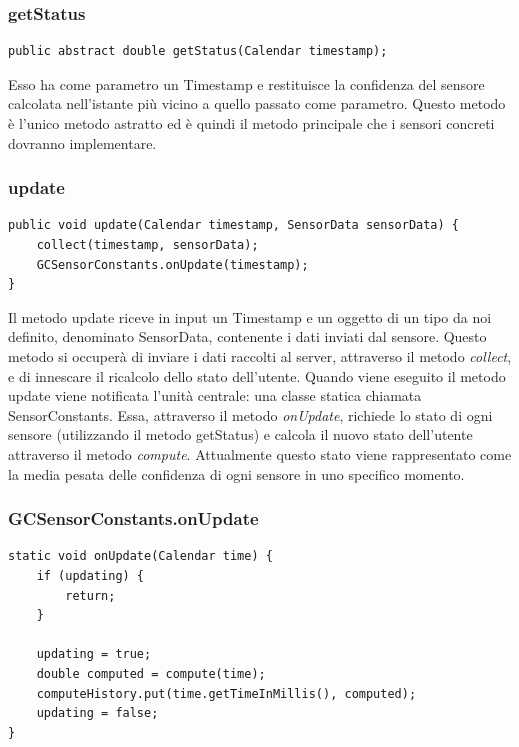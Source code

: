 \subsubsection{getStatus}
\begin{verbatim}
public abstract double getStatus(Calendar timestamp);
\end{verbatim}
Esso ha come parametro un Timestamp e restituisce la confidenza del sensore calcolata nell'istante più vicino a quello passato come parametro. Questo metodo è l'unico metodo astratto ed è quindi il metodo principale che i sensori concreti dovranno implementare.
\subsubsection{update}

\begin{verbatim}
public void update(Calendar timestamp, SensorData sensorData) {
    collect(timestamp, sensorData);
    GCSensorConstants.onUpdate(timestamp);
}
\end{verbatim}
Il metodo update riceve in input un Timestamp e un oggetto di un tipo da noi definito, denominato SensorData, contenente i dati inviati dal sensore. Questo metodo si occuperà di inviare i dati raccolti al server, attraverso il metodo \textit{collect}, e di innescare il ricalcolo dello stato dell'utente.
Quando viene eseguito il metodo update viene notificata l'unità centrale: una classe statica chiamata SensorConstants. Essa, attraverso il metodo \textit{onUpdate}, richiede lo stato di ogni sensore (utilizzando il metodo getStatus) e calcola il nuovo stato dell'utente attraverso il metodo \textit{compute}. Attualmente questo stato viene rappresentato come la media pesata delle confidenza di ogni sensore in uno specifico momento.

\subsubsection{GCSensorConstants.onUpdate}
\begin{verbatim}
static void onUpdate(Calendar time) {
    if (updating) {
        return;
    }

    updating = true;
    double computed = compute(time);
    computeHistory.put(time.getTimeInMillis(), computed);
    updating = false;
}
\end{verbatim}

